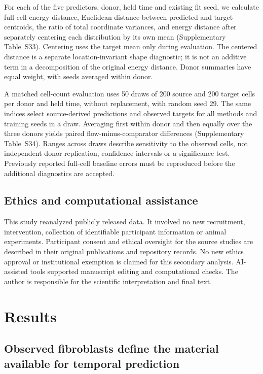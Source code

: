 \documentclass[10pt,a4paper]{article}
\begin{document}
For each of the five predictors, donor, held time and existing fit seed, we calculate full-cell energy distance, Euclidean distance between predicted and target centroids, the ratio of total coordinate variances, and energy distance after separately centering each distribution by its own mean (Supplementary Table~S33). Centering uses the target mean only during evaluation. The centered distance is a separate location-invariant shape diagnostic; it is not an additive term in a decomposition of the original energy distance. Donor summaries have equal weight, with seeds averaged within donor.

A matched cell-count evaluation uses 50 draws of 200 source and 200 target cells per donor and held time, without replacement, with random seed 29. The same indices select source-derived predictions and observed targets for all methods and training seeds in a draw. Averaging first within donor and then equally over the three donors yields paired flow-minus-comparator differences (Supplementary Table~S34). Ranges across draws describe sensitivity to the observed cells, not independent donor replication, confidence intervals or a significance test. Previously reported full-cell baseline errors must be reproduced before the additional diagnostics are accepted.


\subsection{Ethics and computational assistance}
This study reanalyzed publicly released data. It involved no new recruitment, intervention, collection of identifiable participant information or animal experiments. Participant consent and ethical oversight for the source studies are described in their original publications and repository records. No new ethics approval or institutional exemption is claimed for this secondary analysis.
AI-assisted tools supported manuscript editing and computational checks. The author is responsible for the scientific interpretation and final text.

\section{Results}
\subsection{Observed fibroblasts define the material available for temporal prediction}
\end{document}
